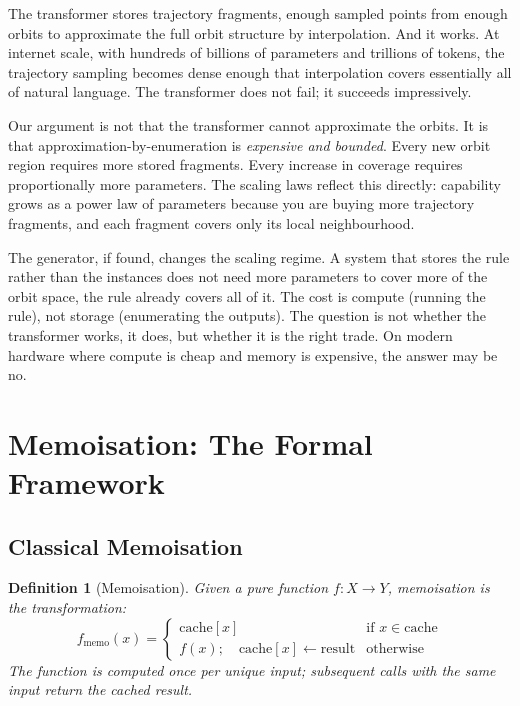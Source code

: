 \documentclass[11pt, a4paper]{article}
\newtheorem{definition}{Definition}
\theoremstyle{remark}
\begin{document}
The transformer stores trajectory fragments, enough sampled points from enough orbits to approximate the full orbit structure by interpolation.
And it works.
At internet scale, with hundreds of billions of parameters and trillions of tokens, the trajectory sampling becomes dense enough that interpolation covers essentially all of natural language.
The transformer does not fail; it succeeds impressively.

Our argument is not that the transformer cannot approximate the orbits.
It is that approximation-by-enumeration is \emph{expensive and bounded}.
Every new orbit region requires more stored fragments.
Every increase in coverage requires proportionally more parameters.
The scaling laws reflect this directly: capability grows as a power law of parameters because you are buying more trajectory fragments, and each fragment covers only its local neighbourhood.

The generator, if found, changes the scaling regime.
A system that stores the rule rather than the instances does not need more parameters to cover more of the orbit space, the rule already covers all of it.
The cost is compute (running the rule), not storage (enumerating the outputs).
The question is not whether the transformer works, it does, but whether it is the right trade.
On modern hardware where compute is cheap and memory is expensive, the answer may be no.


\section{Memoisation: The Formal Framework}
\label{sec:memoisation}

\subsection{Classical Memoisation}

\begin{definition}[Memoisation]
Given a pure function $f: X \to Y$, memoisation is the transformation:
\[
    f_{\text{memo}}(x) = \begin{cases} \text{cache}[x] & \text{if } x \in \text{cache} \\ f(x); \quad \text{cache}[x] \leftarrow \text{result} & \text{otherwise} \end{cases}
\]
The function is computed once per unique input; subsequent calls with the same input return the cached result.
\end{definition}
\end{document}
